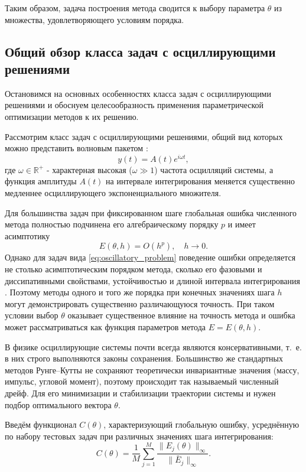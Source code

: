 Таким образом, задача построения метода сводится к выбору параметра $\theta$ из множества, удовлетворяющего условиям порядка.

\subsection{Общий обзор класса задач с осциллирующими решениями}
Остановимся на основных особенностях класса задач с осциллирующими решениями и обоснуем целесообразность применения параметрической оптимизации методов к их решению.

Рассмотрим класс задач с осциллирующими решениями, общий вид которых можно представить волновым пакетом \cite{Lambert1976}: 
\begin{equation}\label{eq:oscillatory_problem}
	y(t) = A(t) e^{i \omega t},
\end{equation}
где $\omega \in \mathbb{R}^+$ - характерная высокая ($\omega \gg 1$) частота осцилляций системы, а функция амплитуды $A(t)$ на интервале интегрирования меняется существенно медленнее осциллирующего экспоненциального множителя.

Для большинства задач при фиксированном шаге глобальная ошибка численного метода полностью подчинена его алгебраическому порядку $p$ и имеет асимптотику
\begin{equation*}
	E(\theta, h) = O(h^p), \quad h \to 0.
\end{equation*}
Однако для задач вида \eqref{eq:oscillatory_problem} поведение ошибки определяется не столько асимптотическим порядком метода, сколько его фазовыми и диссипативными свойствами, устойчивостью и длиной интервала интегрирования \cite{Anastassi2023}. Поэтому методы одного и того же порядка при конечных значениях шага $h$ могут демонстрировать существенно различающуюся точность.  При таком условии выбор $\theta$ оказывает существенное влияние на точность метода и ошибка может рассматриваться как функция параметров метода $E = E(\theta, h)$.

В физике осциллирующие системы почти всегда являются консервативными, т.~е. в них строго выполняются законы сохранения. Большинство же стандартных методов Рунге--Кутты не сохраняют теоретически инвариантные значения (массу, импульс, угловой момент), поэтому происходит так называемый численный дрейф. Для его минимизации и стабилизации траектории системы и нужен подбор оптимального вектора $\theta$.

Введём функционал $C(\theta)$, характеризующий глобальную ошибку, усреднённую по набору тестовых задач при различных значениях шага интегрирования:
\begin{equation}
	\label{eq:functional}
	C(\theta) = \frac{1}{M} \sum_{j=1}^{M} \frac{\|E_j(\theta)\|_\infty}{\|\bar{E}_j\|_\infty}.
\end{equation}

